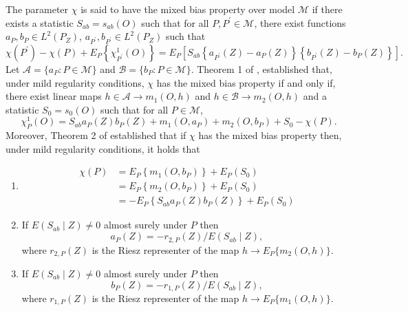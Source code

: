 \documentclass{article}
\begin{document}
The parameter $\chi $ is said to have the mixed bias property over model $%
\mathcal{M}$ if there exists a statistic $S_{ab}=s_{ab}(O)$ such that for
all $P,P^{\prime }\in \mathcal{M}$, there exist functions $a_{P},b_{P}\in
L^{2}(P_{Z})$, $a_{P^{\prime }},b_{P^{\prime }}\in L^{2}(P_{Z})$ such that 
\begin{equation*}
\chi (P^{\prime })-\chi (P)+E_{P}\left\{ \chi _{P^{\prime }}^{1}(O)\right\}
=E_{P}\left[ S_{ab}\left\{ a_{P^{\prime }}(Z)-a_{P}(Z)\right\} \left\{
b_{P^{\prime }}(Z)-b_{P}(Z)\right\} \right] .
\end{equation*}%
Let $\mathcal{A}=\{a_{P}:P\in \mathcal{M}\}$ and $\mathcal{B}=\{b_{P}:P\in 
\mathcal{M}\}$. Theorem 1 of \cite{characterization}, established that,
under mild regularity conditions, $\chi $ has the mixed bias property if and
only if, there exist linear maps $h\in \mathcal{A}\rightarrow m_{1}(O,h)$
and $h\in \mathcal{B}\rightarrow m_{2}(O,h)$ and a statistic $S_{0}=s_{0}(O)$
such that for all $P\in \mathcal{M}$, 
\begin{equation*}
\chi
_{P}^{1}(O)=S_{ab}a_{P}(Z)b_{P}(Z)+m_{1}(O,a_{P})+m_{2}(O,b_{P})+S_{0}-\chi
(P).
\end{equation*}%
Moreover, Theorem 2 of \cite{characterization} established that if $\chi $
has the mixed bias property then, under mild regularity conditions, it holds
that

\begin{enumerate}
\item 
\begin{align*}
\chi(P)&=E_{P}\left\lbrace m_{1}(O,b_{P})\right\rbrace + E_{P}(S_0) \\
&=E_{P}\left\lbrace m_{2}(O,b_{P})\right\rbrace+ E_{P}(S_0) \\
&=- E_{P}\left\lbrace S_{ab}a_{P}(Z)b_{P}(Z)\right\rbrace + E_{P}(S_0)
\end{align*}

\item If $E(S_{ab}\mid Z)\neq 0$ almost surely under $P$ then 
\begin{equation*}
a_{P}(Z)=-r_{2,P}(Z)/E(S_{ab}\mid Z),
\end{equation*}
where $r_{2,P}(Z)$ is the Riesz representer of the map $h\to E_{P}\lbrace
m_{2}(O,h)\rbrace$. 

\item If $E(S_{ab}\mid Z)\neq 0$ almost surely under $P$ then 
\begin{equation*}
b_{P}(Z)=-r_{1,P}(Z)/E(S_{ab}\mid Z),
\end{equation*}
where $r_{1,P}(Z)$ is the Riesz representer of the map $h\to E_{P}\lbrace
m_{1}(O,h)\rbrace$.
\end{enumerate}
\end{document}
